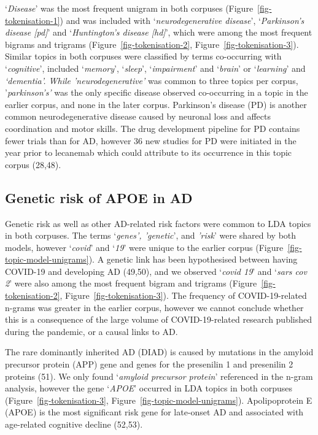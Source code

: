 \documentclass[
  a4paper,
]{article}
\begin{document}
`\emph{Disease}' was the most frequent unigram in both corpuses
(Figure~\ref{fig-tokenisation-1}) and was included with
`\emph{neurodegenerative disease}', `\emph{Parkinson's disease
{[}pd{]}}' and `\emph{Huntington's disease {[}hd{]}}', which were among
the most frequent bigrams and trigrams
(Figure~\ref{fig-tokenisation-2}, Figure~\ref{fig-tokenisation-3}).
Similar topics in both corpuses were classified by terms co-occurring
with `\emph{cognitive}', included `\emph{memory}', `\emph{sleep}',
`\emph{impairment}' and `\emph{brain}' or `\emph{learning}' and
\emph{`dementia\emph{'. While '}neurodegenerative'} was common to three
topics per corpus, '\emph{parkinson's'} was the only specific disease
observed co-occurring in a topic in the earlier corpus, and none in the
later corpus. Parkinson's disease (PD) is another common
neurodegenerative disease caused by neuronal loss and affects
coordination and motor skills. The drug development pipeline for PD
contains fewer trials than for AD, however 36 new studies for PD were
initiated in the year prior to lecanemab which could attribute to its
occurrence in this topic corpus (28,48).

\hypertarget{genetic-risk-of-apoe-in-ad}{%
\subsection{Genetic risk of APOE in
AD}\label{genetic-risk-of-apoe-in-ad}}

Genetic risk as well as other AD-related risk factors were common to LDA
topics in both corpuses. The terms `\emph{genes', 'genetic}', and
\emph{'risk}' were shared by both models, however `\emph{covid}' and
`\emph{19}' were unique to the earlier corpus
(Figure~\ref{fig-topic-model-unigrams}). A genetic link has been
hypothesised between having COVID-19 and developing AD (49,50), and we
observed `\emph{covid 19}' and `\emph{sars cov 2}' were also among the
most frequent bigram and trigrams
(Figure~\ref{fig-tokenisation-2}, Figure~\ref{fig-tokenisation-3}). The
frequency of COVID-19-related n-grams was greater in the earlier corpus,
however we cannot conclude whether this is a consequence of the large
volume of COVID-19-related research published during the pandemic, or a
causal links to AD.

The rare dominantly inherited AD (DIAD) is caused by mutations in the
amyloid precursor protein (APP) gene and genes for the presenilin 1 and
presenilin 2 proteins (51). We only found `\emph{amyloid precursor
protein}' referenced in the n-gram analysis, however the gene
`\emph{APOE}' occurred in LDA topics in both corpuses
(Figure~\ref{fig-tokenisation-3}, Figure~\ref{fig-topic-model-unigrams}).
Apolipoprotein E (APOE) is the most significant risk gene for late-onset
AD and associated with age-related cognitive decline (52,53).
\end{document}
